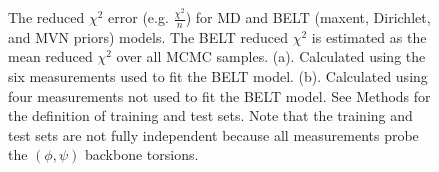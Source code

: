\documentclass[11pt,titlepage]{article}
\begin{document}
\begin{figure}
\caption{
The reduced $\chi^2$ error (e.g. $\frac{\chi^2}{n}$) for MD and BELT (maxent, Dirichlet, and MVN priors) models.  The BELT reduced $\chi^2$ is estimated as the mean reduced $\chi^2$ over all MCMC samples.  (a).  Calculated using the six measurements used to fit the BELT model.  (b).  Calculated using four measurements not used to fit the BELT model.  See Methods for the definition of training and test sets.  Note that the training and test sets are not fully independent because all measurements probe the $(\phi, \psi)$ backbone torsions.
}
\label{figure:ChiSquared}
\end{figure}
\end{document}
